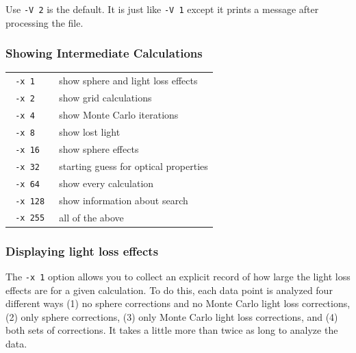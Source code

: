 \documentclass{article}
\begin{document}
Use \texttt{-V 2} is the default.  It is just like \texttt{-V 1} except it 
prints a message after processing the file.

\subsubsection{Showing Intermediate Calculations}

\begin{center}
\begin{tabular}{lp{7cm}}
\texttt{ -x 1                }& show sphere and light loss effects              \\
\texttt{ -x 2                }& show grid calculations             \\
\texttt{ -x 4                }& show Monte Carlo iterations              \\
\texttt{ -x 8                }& show lost light          \\
\texttt{ -x 16                }& show sphere effects              \\
\texttt{ -x 32                }& starting guess for optical properties               \\
\texttt{ -x 64                }& show every calculation              \\
\texttt{ -x 128                }& show information about search               \\
\texttt{ -x 255                }& all of the above         \\
\end{tabular}
\end{center}

\subsubsection{Displaying light loss effects}
The \texttt{-x 1} option allows you to collect an explicit record of how
large the light loss effects are for a given calculation.  To do this,
each data point is analyzed four different ways (1) no sphere corrections
and no Monte Carlo light loss corrections, (2) only sphere corrections,
(3) only Monte Carlo light loss corrections, and (4) both sets of corrections.
It takes a little more than twice as long to analyze the data.
\end{document}
